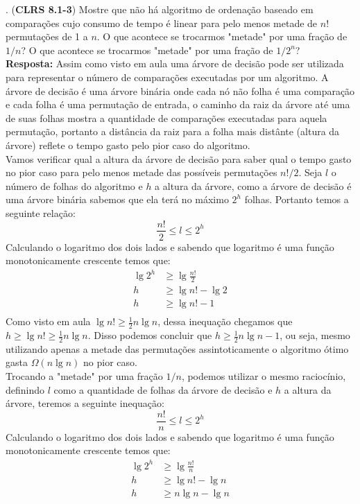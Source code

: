 . (\textbf{CLRS 8.1-3}) Mostre que não há algoritmo de ordenação 
baseado em comparações cujo consumo de tempo é linear para pelo menos metade de 
$n!$ permutações de 1 a $n$. O que acontece se trocarmos "metade" por uma 
fração 
de $1/n$? O que acontece se trocarmos "metade" por uma fração de $1/2^n$?
\\ [6pt]
\textbf{Resposta:} Assim como visto em aula uma árvore de decisão pode ser 
utilizada para representar o número de comparações executadas por um algoritmo. 
A árvore de decisão é uma árvore binária onde cada nó não folha é uma 
comparação 
e cada folha é uma permutação de entrada, o caminho da raiz da árvore até uma 
de 
suas folhas mostra a quantidade de comparações executadas para aquela 
permutação, portanto a distância da raiz para a folha mais distânte (altura da 
árvore) reflete o tempo gasto pelo pior caso do algoritmo.
\\[6pt]
Vamos verificar qual a altura da árvore de decisão para saber qual o tempo 
gasto 
no pior caso para pelo menos metade das possíveis permutações $n!/2$. Seja $l$ 
o 
número de folhas do algoritmo e $h$ a altura da árvore, como a árvore de 
decisão 
é uma árvore binária sabemos que ela terá no máximo $2^h$ folhas. Portanto 
temos 
a seguinte relação:
\[ \frac{n!}{2} \leq l \leq 2^h \]
Calculando o logaritmo dos dois lados e sabendo que logaritmo é uma função 
monotonicamente crescente temos que:
\begin{align*}
     \lg 2^h  &\geq  \lg \frac{n!}{2} \\
     h & \geq \lg n! - \lg 2 \\
     h & \geq \lg n! - 1 \\
\end{align*}
Como visto em aula $\lg n! \geq \frac{1}{2} n \lg n$, dessa inequação chegamos 
que $h \geq \lg n! \geq \frac{1}{2} n \lg n$. Disso podemos concluir que $h 
\geq 
\frac{1}{2} n \lg n - 1$, ou seja, mesmo utilizando apenas a metade das 
permutações assintoticamente o algoritmo ótimo gasta $\Omega(n \lg n)$ no pior 
caso.
\\[6pt]
Trocando a "metade" por uma fração $1/n$, podemos utilizar o mesmo raciocínio, 
definindo $l$ como a quantidade de folhas da árvore de decisão e $h$ a altura 
da 
árvore, teremos a seguinte inequação:
\[ \frac{n!}{n} \leq l \leq 2^h \]
Calculando o logaritmo dos dois lados e sabendo que logaritmo é uma função 
monotonicamente crescente temos que:
\begin{align*}
     \lg 2^h  &\geq  \lg \frac{n!}{n} \\
     h & \geq \lg n! - \lg n  \\
     h & \geq n\lg n - \lg n \\
\end{align*}
